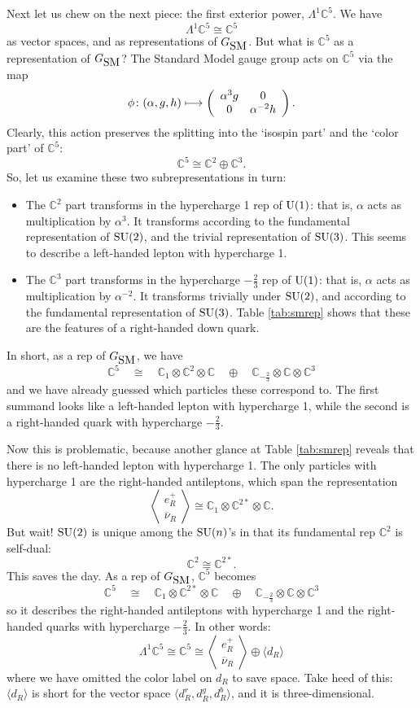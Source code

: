 \documentclass[12pt]{article}
\newcommand{\maps}{\colon}    %
\newcommand{\C}{{\mathbb C}}  %
\newcommand{\U}{{\rm U}}    %
\newcommand{\SU}{{\rm SU}}    %
\newcommand{\Ex}{\Lambda} %
\newcommand{\iso}{\cong} %
\newcommand{\twothirds}{\frac{2}{3}} %
\newcommand{\GSM}{{G_{\mbox{\rm SM}}}}  %
\newcommand{\nubar}{\overline{\nu}} %
\newcommand{\angantilep}{\left\langle \! \begin{array}{c} e^+_R \\ \nubar_R \end{array} \! \right\rangle} %
\begin{document}
Next let us chew on the next piece: the first exterior power, $\Ex^1
\C^5$.  We have
\[ \Ex^1 \C^5 \iso \C^5 \]
as vector spaces, and as representations of $\GSM$.  But what is $\C^5$ as
a representation of $\GSM$?  The Standard Model gauge group acts on 
$\C^5$ via the map
\[ \phi \maps (\alpha, g, h) \longmapsto 
\left( 
\begin{array}{c c}
\alpha^{3}g & 0 \\
0 & \alpha^{-2}h
\end{array}
\right) .
\]
Clearly, this action preserves the splitting into the `isospin part'
and the `color part' of $\C^5$:
\[ \C^5 \iso \C^2 \oplus \C^3 .\]
So, let us examine these two subrepresentations in turn:
\begin{itemize}
	\item The $\C^2$ part transforms in the hypercharge 1 rep of $\U(1)$:
		that is, $\alpha$ acts as multiplication by $\alpha^3$.  It
		transforms according to the fundamental representation of
		$\SU(2)$, and the trivial representation of $\SU(3)$.  This
		seems to describe a left-handed lepton with hypercharge 1.

	\item The $\C^3$ part transforms in the hypercharge $-\twothirds$ rep
		of $\U(1)$: that is, $\alpha$ acts as multiplication by
		$\alpha^{-2}$.  It transforms trivially under $\SU(2)$, and
		according to the fundamental representation of $\SU(3)$.  Table
		\ref{tab:smrep} shows that these are the features of a
		right-handed down quark.
\end{itemize}

In short, as a rep of $\GSM$, we have
\[ \C^5 \quad \iso \quad 
\C_1 \otimes \C^2 \otimes \C \quad \oplus 
\quad \C_{-\twothirds} \otimes \C \otimes \C^3 \]
and we have already guessed which particles these correspond to. 
The first summand looks like a left-handed lepton with hypercharge 1, 
while the second is a right-handed quark with hypercharge $-\twothirds$.

Now this is problematic, because another glance at Table \ref{tab:smrep}
reveals that there is no left-handed lepton with 
hypercharge 1.  The only particles with hypercharge 1 are the right-handed 
antileptons, which span the representation
\[ \angantilep \iso \C_1 \otimes \C^{2*} \otimes \C. \]
But wait! $\SU(2)$ is unique among the $\SU(n)$'s in that its fundamental rep
$\C^2$ is self-dual:
\[ \C^2 \iso \C^{2*}. \]
This saves the day. As a rep of $\GSM$, $\C^5$ becomes
\[ \C^5 \quad \iso \quad
\C_1 \otimes \C^{2*} \otimes \C \quad \oplus \quad 
\C_{-\twothirds} \otimes \C \otimes \C^3 \]
so it describes the right-handed antileptons with hypercharge 1 
and the right-handed quarks with hypercharge $-\twothirds$. 
In other words:
\[ \Ex^1 \C^5 \iso \C^5 \iso \angantilep \oplus \langle d_R \rangle \]
where we have omitted the color label on $d_R$ to save space. Take heed of 
this: $\langle d_R \rangle$ is short for the vector space
$\langle d^r_R, d^g_R, d^b_R \rangle$, and it is three-dimensional.
\end{document}
